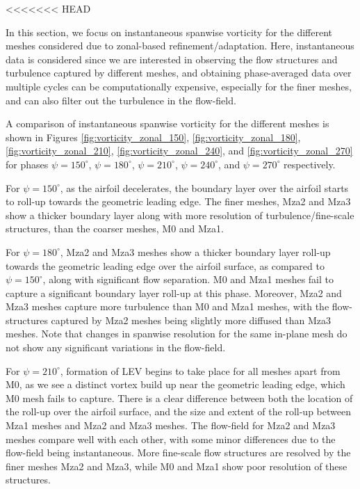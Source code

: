 <<<<<<< HEAD



In this section, we focus on instantaneous spanwise vorticity for the different meshes considered due to zonal-based refinement/adaptation. Here, instantaneous data is considered since we are interested in observing the flow structures and turbulence captured by different meshes, and obtaining phase-averaged data over multiple cycles can be computationally expensive, especially for the finer meshes, and can also filter out the turbulence in the flow-field.

A comparison of instantaneous spanwise vorticity for the different meshes is shown in Figures \ref{fig:vorticity_zonal_150}, \ref{fig:vorticity_zonal_180}, \ref{fig:vorticity_zonal_210}, \ref{fig:vorticity_zonal_240}, and \ref{fig:vorticity_zonal_270} for phases $\psi=150^\circ$, $\psi=180^\circ$, $\psi=210^\circ$, $\psi=240^\circ$, and $\psi=270^\circ$ respectively. 

For $\psi=150^\circ$, as the airfoil decelerates, the boundary layer over the airfoil starts to roll-up towards the geometric leading edge. The finer meshes, Mza2 and Mza3 show a thicker boundary layer along with more resolution of turbulence/fine-scale structures, than
the coarser meshes, M0 and Mza1.

For $\psi=180^\circ$, Mza2 and Mza3 meshes show a thicker boundary layer roll-up towards the geometric leading edge over the airfoil surface, as compared to $\psi=150^\circ$, along with significant flow separation. M0 and Mza1 meshes fail to capture a significant boundary layer roll-up at this phase. Moreover, Mza2 and Mza3 meshes capture more turbulence than M0 and Mza1 meshes, with the flow-structures captured by Mza2 meshes being slightly more diffused than Mza3 meshes. Note that changes in spanwise resolution for the same in-plane mesh do not show any significant variations in the flow-field.

For $\psi=210^\circ$, formation of LEV begins to take place for all meshes apart from M0, as we see a distinct vortex build up near the geometric leading edge, which M0 mesh fails to capture. There is a clear difference between both the location of the roll-up over the airfoil surface, and the size and extent of the roll-up between Mza1 meshes and Mza2 and Mza3 meshes. The flow-field for Mza2 and Mza3 meshes compare well with each other, with some minor differences due to the flow-field being instantaneous. More fine-scale flow structures are resolved by the finer meshes Mza2 and Mza3, while M0 and Mza1 show poor resolution of these structures.

